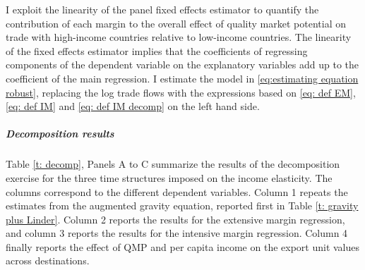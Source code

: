 \documentclass[12pt,a4paper,oneside,times]{article}   	%
\DeclareMathOperator{\MP}{QMP}
\DeclareMathOperator{\IM}{IM}
\DeclareMathOperator{\IMP}{IMP}
\DeclareMathOperator{\EM}{EM}
\begin{document}

I exploit the linearity of the panel fixed effects estimator to quantify the contribution of each margin to the overall effect of quality market potential on trade with high-income countries relative to low-income countries. The linearity of the fixed effects estimator implies that the coefficients of regressing components of the dependent variable on the explanatory variables add up to the coefficient of the main regression. I estimate the model in \eqref{eq:estimating equation robust}, replacing the log trade flows  with the expressions based on \eqref{eq: def EM}, \eqref{eq: def IM} and \eqref{eq: def IM decomp} on the left hand side.   
%

\subparagraph{Decomposition results} 

Table \ref{t: decomp}, Panels A to C summarize the results of the decomposition exercise for the three time structures imposed on the income elasticity. 
The columns correspond to the different dependent variables. Column 1 repeats the estimates from the augmented gravity equation, reported first in Table \ref{t: gravity plus Linder}. Column 2 reports the results for the extensive margin  regression, and  column 3 reports the results for the intensive margin regression. Column 4 finally reports the effect of QMP and per capita income on the export unit values across destinations. 
\end{document}
